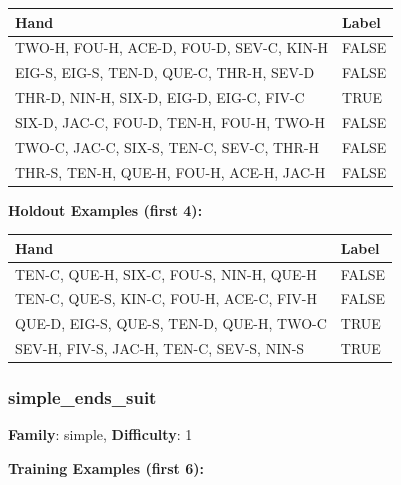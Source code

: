 \documentclass[10pt,a4paper]{article}
\begin{document}
\begin{small}
\begin{tabular}{p{8cm}l}
\toprule
Hand & Label \\
\midrule
TWO-H, FOU-H, ACE-D, FOU-D, SEV-C, KIN-H & \textcolor{negative}{FALSE} \\
EIG-S, EIG-S, TEN-D, QUE-C, THR-H, SEV-D & \textcolor{negative}{FALSE} \\
THR-D, NIN-H, SIX-D, EIG-D, EIG-C, FIV-C & \textcolor{positive}{TRUE} \\
SIX-D, JAC-C, FOU-D, TEN-H, FOU-H, TWO-H & \textcolor{negative}{FALSE} \\
TWO-C, JAC-C, SIX-S, TEN-C, SEV-C, THR-H & \textcolor{negative}{FALSE} \\
THR-S, TEN-H, QUE-H, FOU-H, ACE-H, JAC-H & \textcolor{negative}{FALSE} \\
\bottomrule
\end{tabular}
\end{small}

\textbf{Holdout Examples (first 4):}

\begin{small}
\begin{tabular}{p{8cm}l}
\toprule
Hand & Label \\
\midrule
TEN-C, QUE-H, SIX-C, FOU-S, NIN-H, QUE-H & \textcolor{negative}{FALSE} \\
TEN-C, QUE-S, KIN-C, FOU-H, ACE-C, FIV-H & \textcolor{negative}{FALSE} \\
QUE-D, EIG-S, QUE-S, TEN-D, QUE-H, TWO-C & \textcolor{positive}{TRUE} \\
SEV-H, FIV-S, JAC-H, TEN-C, SEV-S, NIN-S & \textcolor{positive}{TRUE} \\
\bottomrule
\end{tabular}
\end{small}

\vspace{0.5cm}

\subsubsection{simple\_ends\_suit}

\textbf{Family}: simple, \textbf{Difficulty}: 1

\textbf{Training Examples (first 6):}
\end{document}
